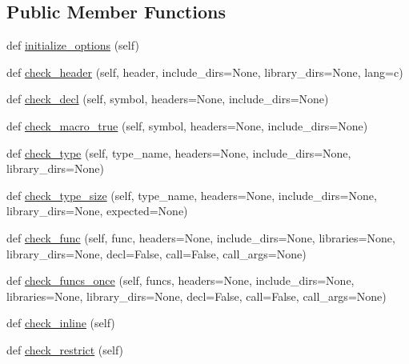 \subsection*{Public Member Functions}
\begin{DoxyCompactItemize}
\item 
def \hyperlink{classnumpy_1_1distutils_1_1command_1_1config_1_1config_a56e45705ea4eb4e87e00841d5361a52c}{initialize\+\_\+options} (self)
\item 
def \hyperlink{classnumpy_1_1distutils_1_1command_1_1config_1_1config_a9e72abd53a7a5bad3fb4c272ed38e8fb}{check\+\_\+header} (self, header, include\+\_\+dirs=None, library\+\_\+dirs=None, lang=\textquotesingle{}c\textquotesingle{})
\item 
def \hyperlink{classnumpy_1_1distutils_1_1command_1_1config_1_1config_a381b52f82e8a9f2ff8b59b3a7b7ac0a6}{check\+\_\+decl} (self, symbol, headers=None, include\+\_\+dirs=None)
\item 
def \hyperlink{classnumpy_1_1distutils_1_1command_1_1config_1_1config_a4742e986ed799c75305d4e2b710eba45}{check\+\_\+macro\+\_\+true} (self, symbol, headers=None, include\+\_\+dirs=None)
\item 
def \hyperlink{classnumpy_1_1distutils_1_1command_1_1config_1_1config_a700ab11b852a3cbc250a3c7110bb6710}{check\+\_\+type} (self, type\+\_\+name, headers=None, include\+\_\+dirs=None, library\+\_\+dirs=None)
\item 
def \hyperlink{classnumpy_1_1distutils_1_1command_1_1config_1_1config_aedbe4f109a0c23f5bb1516120b680158}{check\+\_\+type\+\_\+size} (self, type\+\_\+name, headers=None, include\+\_\+dirs=None, library\+\_\+dirs=None, expected=None)
\item 
def \hyperlink{classnumpy_1_1distutils_1_1command_1_1config_1_1config_aaf69c726b0a1e17ffbe773e38bb85d55}{check\+\_\+func} (self, func, headers=None, include\+\_\+dirs=None, libraries=None, library\+\_\+dirs=None, decl=False, call=False, call\+\_\+args=None)
\item 
def \hyperlink{classnumpy_1_1distutils_1_1command_1_1config_1_1config_abb578f61e671672d0d8cc090d5106532}{check\+\_\+funcs\+\_\+once} (self, funcs, headers=None, include\+\_\+dirs=None, libraries=None, library\+\_\+dirs=None, decl=False, call=False, call\+\_\+args=None)
\item 
def \hyperlink{classnumpy_1_1distutils_1_1command_1_1config_1_1config_ab777f657b92b09a5c480b0e76e8874aa}{check\+\_\+inline} (self)
\item 
def \hyperlink{classnumpy_1_1distutils_1_1command_1_1config_1_1config_a57a7a9b1f50fcbb942ae9dc7628d521f}{check\+\_\+restrict} (self)

\end{DoxyCompactItemize}
